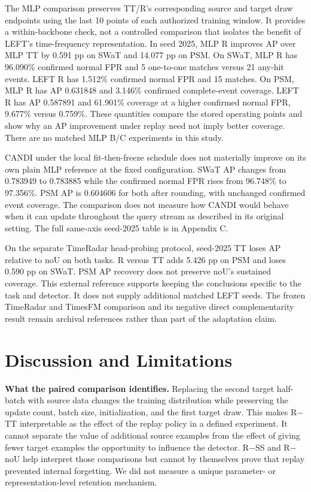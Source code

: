 \documentclass[pdflatex,sn-apa]{sn-jnl}
\begin{document}
The MLP comparison preserves TT/R's corresponding source and target draw
endpoints using the last 10 points of each authorized training window.
It provides a within-backbone check, not a controlled comparison that
isolates the benefit of LEFT's time-frequency representation. In seed
2025, MLP R improves AP over MLP TT by 0.591 pp on SWaT and 14.077 pp on
PSM. On SWaT, MLP R has 96.090\% confirmed normal FPR and 5 one-to-one
matches versus 21 any-hit events. LEFT R has 1.512\% confirmed normal
FPR and 15 matches. On PSM, MLP R has AP 0.631848 and 3.146\% confirmed
complete-event coverage. LEFT R has AP 0.587891 and 61.901\% coverage at
a higher confirmed normal FPR, 9.677\% versus 0.759\%. These quantities
compare the stored operating points and show why an AP improvement under
replay need not imply better coverage. There are no matched MLP B/C
experiments in this study.

CANDI under the local fit-then-freeze schedule does not materially
improve on its own plain MLP reference at the fixed configuration. SWaT
AP changes from 0.783949 to 0.783885 while the confirmed normal FPR
rises from 96.748\% to 97.356\%. PSM AP is 0.604606 for both after
rounding, with unchanged confirmed event coverage. The comparison does
not measure how CANDI would behave when it can update throughout the
query stream as described in its original setting. The full same-axis
seed-2025 table is in Appendix C.

On the separate TimeRadar head-probing protocol, seed-2025 TT loses AP
relative to noU on both tasks. R versus TT adds 5.426 pp on PSM and
loses 0.590 pp on SWaT. PSM AP recovery does not preserve noU's
sustained coverage. This external reference supports keeping the
conclusions specific to the task and detector. It does not supply
additional matched LEFT seeds. The frozen TimeRadar and TimesFM
comparison and its negative direct complementarity result remain
archival references rather than part of the adaptation claim.

\section{Discussion and Limitations}\label{discussion-and-limitations}

\textbf{What the paired comparison identifies.} Replacing the second
target half-batch with source data changes the training distribution
while preserving the update count, batch size, initialization, and the
first target draw. This makes R\ensuremath{-}TT interpretable as the effect of the
replay policy in a defined experiment. It cannot separate the value of
additional source examples from the effect of giving fewer target
examples the opportunity to influence the detector. R\ensuremath{-}SS and R\ensuremath{-}noU help
interpret those comparisons but cannot by themselves prove that replay
prevented internal forgetting. We did not measure a unique parameter- or
representation-level retention mechanism.
\end{document}
